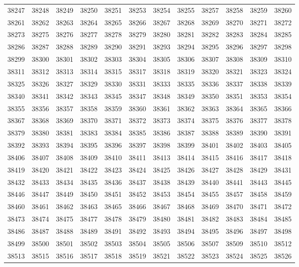\begin{center}
\begin{longtable}{llllllllllll}
38247 &38248 &38249 &38250 &38251 &38253 &38254 &38255 &38257 &38258 &38259 &38260 \\
38261 &38262 &38263 &38264 &38265 &38266 &38267 &38268 &38269 &38270 &38271 &38272 \\
38273 &38275 &38276 &38277 &38278 &38279 &38280 &38281 &38282 &38283 &38284 &38285 \\
38286 &38287 &38288 &38289 &38290 &38291 &38293 &38294 &38295 &38296 &38297 &38298 \\
38299 &38300 &38301 &38302 &38303 &38304 &38305 &38306 &38307 &38308 &38309 &38310 \\
38311 &38312 &38313 &38314 &38315 &38317 &38318 &38319 &38320 &38321 &38323 &38324 \\
38325 &38326 &38327 &38329 &38330 &38331 &38333 &38335 &38336 &38337 &38338 &38339 \\
38340 &38341 &38342 &38343 &38345 &38347 &38348 &38349 &38350 &38351 &38353 &38354 \\
38355 &38356 &38357 &38358 &38359 &38360 &38361 &38362 &38363 &38364 &38365 &38366 \\
38367 &38368 &38369 &38370 &38371 &38372 &38373 &38374 &38375 &38376 &38377 &38378 \\
38379 &38380 &38381 &38383 &38384 &38385 &38386 &38387 &38388 &38389 &38390 &38391 \\
38392 &38393 &38394 &38395 &38396 &38397 &38398 &38399 &38401 &38402 &38403 &38405 \\
38406 &38407 &38408 &38409 &38410 &38411 &38413 &38414 &38415 &38416 &38417 &38418 \\
38419 &38420 &38421 &38422 &38423 &38424 &38425 &38426 &38427 &38428 &38429 &38431 \\
38432 &38433 &38434 &38435 &38436 &38437 &38438 &38439 &38440 &38441 &38443 &38445 \\
38446 &38447 &38449 &38450 &38451 &38452 &38453 &38454 &38455 &38457 &38458 &38459 \\
38460 &38461 &38462 &38463 &38465 &38466 &38467 &38468 &38469 &38470 &38471 &38472 \\
38473 &38474 &38475 &38477 &38478 &38479 &38480 &38481 &38482 &38483 &38484 &38485 \\
38486 &38487 &38488 &38489 &38491 &38492 &38493 &38494 &38495 &38496 &38497 &38498 \\
38499 &38500 &38501 &38502 &38503 &38504 &38505 &38506 &38507 &38509 &38510 &38512 \\
38513 &38515 &38516 &38517 &38518 &38519 &38521 &38522 &38523 &38524 &38525 &38526 \\

\end{longtable}
\end{center}
